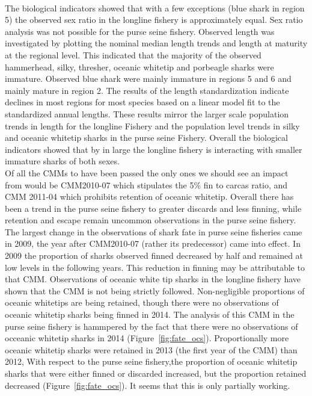 \documentclass[12pt]{SCreport}
\begin{document}
\\
The biological indicators showed that with a few exceptions (blue shark in region 5) the observed
sex ratio in the longline fishery is approximately equal. Sex ratio analysis was not possible for
the purse seine fishery. Observed length was investigated by plotting the nominal median length
trends and length at maturity at the regional level. This indicated that the majority of the observed
hammerhead, silky, thresher, oceanic whitetip and porbeagle sharks were immature. Observed blue
shark were mainly immature in regions 5 and 6 and mainly mature in region 2. The results of the
length standardization indicate declines in most regions for most species based on a linear model fit
to the standardized annual lengths. These results mirror the larger scale population trends in length
for the longline Fishery and the population level trends in silky and oceanic whitetip sharks in the
purse seine Fishery. Overall the biological indicators showed that by in large the longline fishery is
interacting with smaller immature sharks of both sexes.
%
%
%
\\
Of all the CMMs to have been passed the only ones we should see an impact from would be CMM2010-07 which stipulates the 5\% fin to carcas ratio, and CMM 2011-04 which prohibits retention of oceanic whitetip. 
Overall there has been a trend in the purse seine fishery to greater discards and less finning, while retention and escape remain  uncommon observations in the purse seine fishery.
The largest change in the observations of shark fate in purse seine fisheries came in 2009, the year after CMM2010-07 (rather its predecessor) came into effect.  In 2009 the proportion of sharks observed finned decreased by half and remained at low levels in the following years.  This reduction in finning may be attributable to that CMM.   
Observations of  oceanic white tip sharks in the  longline  fishery have shown that the CMM is not being strictly followed. 
Non-negligible proportions of oceanic whitetips are being retained, though there were no observations of oceanic whitetip sharks being finned in 2014.  The analysis of this CMM in the purse seine fishery is hammpered by the fact that there were no observations of occeanic whitetip sharks in 2014  (Figure~\ref{fig:fate_ocs}).  
Proportionally  more oceanic whitetip sharks were retained in 2013 (the first year of the CMM) than 2012,   With respect to the purse seine fishery,the proportion of oceanic whitetip sharks that were either finned or discarded increased, but the proportion retained decreased (Figure~\ref{fig:fate_ocs}).  It seems that this is only partially working.
\end{document}

